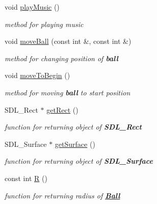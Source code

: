 \begin{DoxyCompactItemize}
\mbox{\label{class_ball_adc1c1957acdd3b85de6869a56c69bdaf}} 
void \mbox{\hyperlink{class_ball_adc1c1957acdd3b85de6869a56c69bdaf}{play\+Music}} ()
\begin{DoxyCompactList}\small\item\em {\itshape method} for playing music \end{DoxyCompactList}\item 
\mbox{\label{class_ball_ac7a2b40efa336742be38a210a869c8ed}} 
void \mbox{\hyperlink{class_ball_ac7a2b40efa336742be38a210a869c8ed}{move\+Ball}} (const int \&, const int \&)
\begin{DoxyCompactList}\small\item\em {\itshape method} for changing position of {\bfseries{ball}} \end{DoxyCompactList}\item 
\mbox{\label{class_ball_a12ee1ff0aa15f5288000bb8fe6bc26d7}} 
void \mbox{\hyperlink{class_ball_a12ee1ff0aa15f5288000bb8fe6bc26d7}{move\+To\+Begin}} ()
\begin{DoxyCompactList}\small\item\em {\itshape method} for moving {\bfseries{ball}} to start {\itshape position} \end{DoxyCompactList}\item 
\mbox{\label{class_ball_afb1ea611549454c3762985bed4da80aa}} 
S\+D\+L\+\_\+\+Rect $\ast$ \mbox{\hyperlink{class_ball_afb1ea611549454c3762985bed4da80aa}{get\+Rect}} ()
\begin{DoxyCompactList}\small\item\em {\itshape function} for returning {\itshape object} of {\bfseries{S\+D\+L\+\_\+\+Rect}} \end{DoxyCompactList}\item 
\mbox{\label{class_ball_a3bb53cb7cdb7e3360043ff5709396de7}} 
S\+D\+L\+\_\+\+Surface $\ast$ \mbox{\hyperlink{class_ball_a3bb53cb7cdb7e3360043ff5709396de7}{get\+Surface}} ()
\begin{DoxyCompactList}\small\item\em {\itshape function} for returning {\itshape object} of {\bfseries{S\+D\+L\+\_\+\+Surface}} \end{DoxyCompactList}\item 
\mbox{\label{class_ball_afb6ea168410a836abe6176ad0b998689}} 
const int \mbox{\hyperlink{class_ball_afb6ea168410a836abe6176ad0b998689}{R}} ()
\begin{DoxyCompactList}\small\item\em {\itshape function} for returning {\itshape radius} of {\bfseries{\mbox{\hyperlink{class_ball}{Ball}}}} \end{DoxyCompactList}\end{DoxyCompactItemize}


